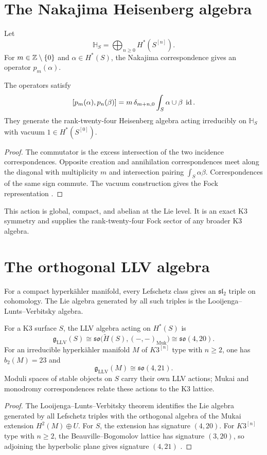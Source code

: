 \chapter{The Nakajima Heisenberg algebra}
Let
\[
 \mathbb H_S=\bigoplus_{n\ge0}H^*(S^{[n]}).
\]
For $m\in\mathbb Z\setminus\{0\}$ and $\alpha\in H^*(S)$, the Nakajima correspondence gives an operator $p_m(\alpha)$.

\begin{theorem}
The operators satisfy
\[
 [p_m(\alpha),p_n(\beta)]
 =m\,\delta_{m+n,0}\int_S\alpha\cup\beta\;\operatorname{id}.
\]
They generate the rank-twenty-four Heisenberg algebra acting irreducibly on $\mathbb H_S$ with vacuum $1\in H^*(S^{[0]})$.
\end{theorem}
\begin{proof}
The commutator is the excess intersection of the two incidence correspondences. Opposite creation and annihilation correspondences meet along the diagonal with multiplicity $m$ and intersection pairing $\int_S\alpha\beta$. Correspondences of the same sign commute. The vacuum construction gives the Fock representation \cite{Nakajima97}.
\end{proof}

This action is global, compact, and abelian at the Lie level. It is an exact K3 symmetry and supplies the rank-twenty-four Fock sector of any broader K3 algebra.

\chapter{The orthogonal LLV algebra}
For a compact hyperkähler manifold, every Lefschetz class gives an $\mathfrak{sl}_2$ triple on cohomology. The Lie algebra generated by all such triples is the Looijenga--Lunts--Verbitsky algebra.

\begin{theorem}
For a K3 surface $S$, the LLV algebra acting on $H^*(S)$ is
\[
 \mathfrak g_{\mathrm{LLV}}(S)
 \cong\mathfrak{so}\bigl(\widetilde H(S),(-,-)_{\mathrm{Muk}}\bigr)
 \cong\mathfrak{so}(4,20).
\]
For an irreducible hyperk\"ahler manifold $M$ of $K3^{[n]}$ type with $n\ge2$, one has $b_2(M)=23$ and
\[
 \mathfrak g_{\mathrm{LLV}}(M)\cong\mathfrak{so}(4,21).
\]
Moduli spaces of stable objects on $S$ carry their own LLV actions; Mukai and monodromy correspondences relate these actions to the K3 lattice.
\end{theorem}
\begin{proof}
The Looijenga--Lunts--Verbitsky theorem identifies the Lie algebra generated by all Lefschetz triples with the orthogonal algebra of the Mukai extension $H^2(M)\oplus U$. For $S$, the extension has signature $(4,20)$. For $K3^{[n]}$ type with $n\ge2$, the Beauville--Bogomolov lattice has signature $(3,20)$, so adjoining the hyperbolic plane gives signature $(4,21)$ \cite{LooijengaLunts,Verbitsky96}.
\end{proof}

